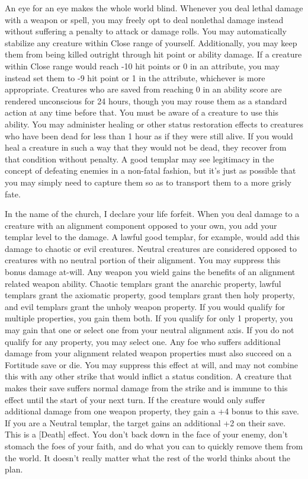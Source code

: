 \begin{optional}
{An eye for an eye makes the whole world blind.}
{Whenever you deal lethal damage with a weapon or spell, you may freely opt to deal nonlethal damage instead without suffering a penalty to attack or damage rolls.}
{You may automatically stabilize any creature within Close range of yourself. Additionally, you may keep them from being killed outright through hit point or ability damage. If a creature within Close range would reach -10 hit points or 0 in an attribute, you may instead set them to -9 hit point or 1 in the attribute, whichever is more appropriate. Creatures who are saved from reaching 0 in an ability score are rendered unconscious for 24 hours, though you may rouse them as a standard action at any time before that. You must be aware of a creature to use this ability.}
{You may administer healing or other status restoration effects to creatures who have been dead for less than 1 hour as if they were still alive. If you would heal a creature in such a way that they would not be dead, they recover from that condition without penalty.}
{A good templar may see legitimacy in the concept of defeating enemies in a non-fatal fashion, but it's just as possible that you may simply need to capture them so as to transport them to a more grisly fate.}

{In the name of the church, I declare your life forfeit.}
{When you deal damage to a creature with an alignment component opposed to your own, you add your templar level to the damage. A lawful good templar, for example, would add this damage to chaotic or evil creatures. Neutral creatures are considered opposed to creatures with no neutral portion of their alignment. You may suppress this bonus damage at-will.}
{Any weapon you wield gains the benefits of an alignment related weapon ability. Chaotic templars grant the anarchic property, lawful templars grant the axiomatic property, good templars grant then holy property, and evil templars grant the unholy weapon property. If you would qualify for multiple properties, you gain them both. If you qualify for only 1 property, you may gain that one or select one from your neutral alignment axis. If you do not qualify for any property, you may select one.}
{Any foe who suffers additional damage from your alignment related weapon properties must also succeed on a Fortitude save or die. You may suppress this effect at will, and may not combine this with any other strike that would inflict a status condition. A creature that makes their save suffers normal damage from the strike and is immune to this effect until the start of your next turn. If the creature would only suffer additional damage from one weapon property, they gain a +4 bonus to this save. If you are a Neutral templar, the target gains an additional +2 on their save. This is a [Death] effect.}
{You don't back down in the face of your enemy, don't stomach the foes of your faith, and do what you can to quickly remove them from the world. It doesn't really matter what the rest of the world thinks about the plan.}


\end{optional}

